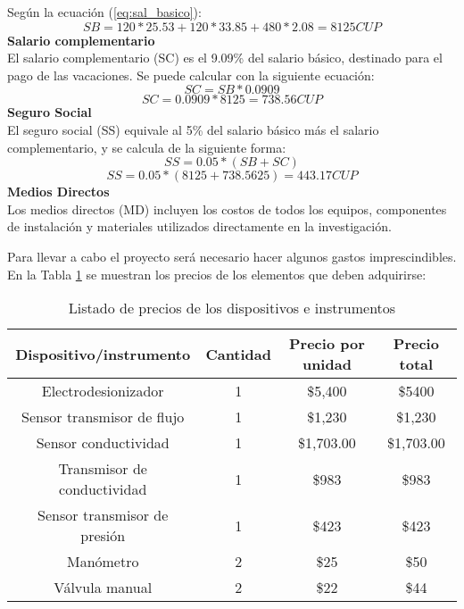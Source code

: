 Según la ecuación (\ref{eq:sal_basico}):
\begin{equation}
    \label{eq:salary_basico_total}
    SB = 120 * 25.53 + 120 * 33.85 + 480 * 2.08 = 8125 CUP
\end{equation}
\textbf{Salario complementario}\\
El salario complementario (SC) es el 9.09\% del salario básico, destinado para el pago de las
vacaciones. Se puede calcular con la siguiente ecuación:
\begin{equation}
    \label{eq:salary_complementary}
    SC = SB * 0.0909
\end{equation}
\begin{equation}
    \label{eq:salary_complementary_total}
    SC=0.0909*8125=738.56 CUP
\end{equation}
\textbf{Seguro Social}\\
El seguro social (SS) equivale al 5\% del salario básico más el salario complementario, y se
calcula de la siguiente forma:
\begin{equation}
    \label{eq:social_security}
    SS = 0.05 * (SB + SC)
\end{equation}
\begin{equation}
    \label{eq:social_security_total}
    SS=0.05*(8125+738.5625)=443.17 CUP
\end{equation}
\textbf{Medios Directos}\\
Los medios directos (MD) incluyen los costos de todos los equipos, componentes de instalación y
materiales utilizados directamente en la investigación.

Para llevar a cabo el proyecto será necesario hacer algunos gastos imprescindibles. En la Tabla \ref{table:precios_dispositivos_instrumentos}
se muestran los precios de los elementos que deben adquirirse:

\begin{table}[h]
    \caption{Listado de precios de los dispositivos e instrumentos}
    \label{table:precios_dispositivos_instrumentos}


    \begin{tabular}{|c|c|c|c|}
        \hline
        Dispositivo/instrumento      & Cantidad & Precio por unidad & Precio total \\
        \hline
        Electrodesionizador          & 1        & \$5,400           & \$5400       \\
        Sensor transmisor de flujo   & 1        & \$1,230           & \$1,230      \\
        Sensor conductividad         & 1        & \$1,703.00        & \$1,703.00   \\
        Transmisor de conductividad  & 1        & \$983             & \$983        \\
        Sensor transmisor de presión & 1        & \$423             & \$423        \\
        Manómetro                    & 2        & \$25              & \$50         \\
        Válvula manual               & 2        & \$22              & \$44         \\
        \hline
    \end{tabular}
\end{table}

